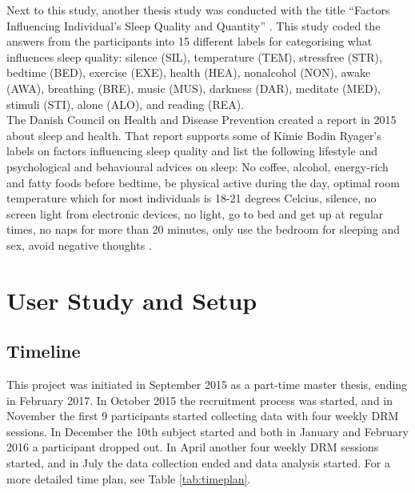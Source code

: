 \documentclass[12pt]{article} %
\begin{document}
Next to this study, another thesis study was conducted with the title ``Factors Influencing Individual's Sleep Quality and Quantity'' \cite{kimie}. This study coded the answers from the participants into 15 different labels for categorising what influences sleep quality: silence (SIL), temperature (TEM), stressfree (STR), bedtime (BED), exercise (EXE), health (HEA), nonalcohol (NON), awake (AWA), breathing (BRE), music (MUS), darkness (DAR), meditate (MED), stimuli (STI), alone (ALO), and reading (REA). \\

The Danish Council on Health and Disease Prevention created a report in 2015 about sleep and health. That report supports some of Kimie Bodin Ryager's labels on factors influencing sleep quality and list the following lifestyle and psychological and behavioural advices on sleep: No coffee, alcohol, energy-rich and fatty foods before bedtime, be physical active during the day, optimal room temperature which for most individuals is 18-21 degrees Celcius, silence, no screen light from electronic devices, no light, go to bed and get up at regular times, no naps for more than 20 minutes, only use the bedroom for sleeping and sex, avoid negative thoughts \cite{vff}. 

\newpage 
\section{User Study and Setup}
\subsection{Timeline}
This project was initiated in September 2015 as a part-time master thesis, ending in February 2017. In October 2015 the recruitment process was started, and in November the first 9 participants started collecting data with four weekly DRM sessions. In December the 10th subject started and both in January and February 2016 a participant dropped out. In April another four weekly DRM sessions started, and in July the data collection ended and data analysis started. For a more detailed time plan, see Table \ref{tab:timeplan}. 
\end{document}
